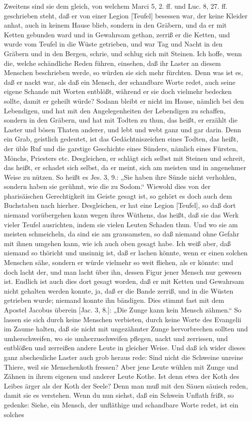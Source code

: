 Zweitens sind sie dem gleich, von welchem Marci 5, 2. ff. und Luc. 8, 27. ff. geschrieben steht, daß er von einer Legion [Teufel] besessen war, der keine Kleider anhat, auch in keinem Hause blieb, sondern in den Gräbern, und da er mit Ketten gebunden ward und in Gewahrsam gethan, zerriß er die Ketten, und wurde vom Teufel in die Wüste getrieben, und war Tag und Nacht in den Gräbern und in den Bergen, schrie, und schlug sich mit Steinen. Ich hoffe, wenn die, welche schändliche Reden führen, einsehen, daß ihr Laster an diesem Menschen beschrieben werde, so würden sie sich mehr fürchten. Denn was ist es, daß er nackt war, als daß ein Mensch, der schandbare Worte redet, auch seine eigene Schande mit Worten entblößt, während er sie doch vielmehr bedecken sollte, damit er geheilt würde? Sodann bleibt er nicht im Hause, nämlich bei den Lebendigen, und hat mit den Angelegenheiten der Lebendigen zu schaffen, sondern in den Gräbern, und hat mit Todten zu thun, das heißt, er erzählt die Laster und bösen Thaten anderer, und lebt und webt ganz und gar darin. Denn ein Grab, geistlich gedeutet, ist das Gedächtniszeichen eines Todten, das heißt, der üble Ruf und die garstige Geschichte eines Sünders, nämlich eines Fürsten, Mönchs, Priesters etc. Desgleichen, er schlägt sich selbst mit Steinen und schreit, das heißt, er schadet sich selbst, da er meint, sich am meisten und in angenehmer Weise zu nützen. So heißt es Jes. 3, 9.: „Sie haben ihre Sünde nicht verhohlen, sondern haben sie gerühmt, wie die zu Sodom.“ Wiewohl dies von der pharisäischen Gerechtigkeit im Geiste gesagt ist, so gehört es doch auch dem Buchstaben nach hierher. Desgleichen, er hat eine Legion [Teufel], so daß dort niemand vorübergehen kann wegen ihres Wüthens, das heißt, daß sie das Werk vieler Teufel ausrichten, indem sie vielen Leuten Schaden thun. Und wo sie am meisten schmeicheln, da sind sie am grausamsten, so daß niemand ohne Gefahr mit ihnen umgehen kann, wie ich auch oben gesagt habe. Ich weiß aber, daß niemand so thöricht und unsinnig ist, daß er lachen könnte, wenn er einen solchen Menschen sähe, sondern er würde vielmehr so weit fliehen, als er könnte: und doch lacht der, und man lacht über ihn, dessen Figur jener Mensch nur gewesen ist. Endlich ist auch dies dort gesagt worden, daß er mit Ketten und Gewahrsam nicht gehalten werden konnte, ja, daß er die Bande zerriß, und in die Wüsten getrieben wurde; niemand konnte ihn bändigen. Dies stimmt fast mit dem Apostel Jacobus überein [Jac. 3, 8.]: „Die Zunge kann kein Mensch zähmen.“ So lassen sie sich durch keine Menschen verbieten, durch keine Worte des Evangelii im Zaume halten, daß sie nicht mit ungezähmter Zunge hervorbrechen sollten und umherschweifen, wo sie umherzuschweifen pflegen, nackt und zerrissen, und entblößen und zerreißen andere Leute in gleicher Weise. Und daß ich wider dieses ganz abscheuliche Laster auch grob heraus rede: Sind nicht die Schweine unreine Thiere, weil sie Menschenkoth fressen? Aber jene Leute wühlen mit Zunge und Zähnen in ihrem eigenen und anderer Leute Kothe. Ist denn etwa der Koth des Leibes ärger als der Koth der Seele? Denn man muß mit den Säuen säuisch reden, damit sie es verstehen. Wenn du nun siehst, daß ein Schwein Unflath frißt, so gedenke: Siehe, ein Mensch, der unfläthige und schandbare Worte redet, ist ein solches 